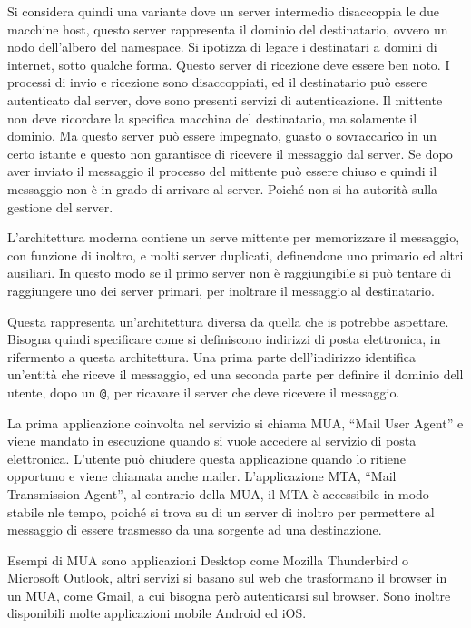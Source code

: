 \documentclass{article}
\numberwithin{equation}{subsection}
\begin{document}
Si considera quindi una variante dove un server intermedio disaccoppia le due macchine host, questo server rappresenta il dominio del destinatario, ovvero un nodo dell'albero del namespace. 
Si ipotizza di legare i destinatari a domini di internet, sotto qualche forma. Questo server di ricezione deve essere ben noto. 
I processi di invio e ricezione sono disaccoppiati, ed il destinatario può essere autenticato dal server, dove sono presenti servizi di autenticazione. Il mittente non deve ricordare la specifica macchina del destinatario, ma solamente il dominio. 
Ma questo server può essere impegnato, guasto o sovraccarico in un certo istante e questo non garantisce di ricevere il messaggio dal server. Se dopo aver inviato il messaggio il processo del mittente può essere chiuso e quindi il messaggio non è in grado di arrivare al server. Poiché non si ha autorità sulla gestione del server. 

L'architettura moderna contiene un serve mittente per memorizzare il messaggio, con funzione di inoltro, e molti server duplicati, definendone uno primario ed altri 
ausiliari. In questo modo se il primo server non è raggiungibile si può tentare di raggiungere uno dei server primari, per inoltrare il messaggio al destinatario. 

Questa rappresenta un'architettura diversa da quella che is potrebbe aspettare. Bisogna quindi specificare come si definiscono indirizzi di posta elettronica, in rifermento a questa architettura. Una prima parte dell'indirizzo identifica un'entità che riceve il messaggio, ed una seconda parte per definire il dominio dell utente, dopo un \verb|@|, per ricavare il server che deve ricevere il messaggio. 

La prima applicazione coinvolta nel servizio si chiama MUA, ``Mail User Agent'' e viene mandato in esecuzione quando si vuole accedere al servizio di posta elettronica. L'utente può chiudere questa applicazione quando lo ritiene opportuno e viene chiamata anche mailer. 
L'applicazione MTA, ``Mail Transmission Agent'', al contrario della MUA, il MTA è accessibile in modo stabile nle tempo, poiché si trova su di un server di inoltro per permettere al messaggio di essere trasmesso da una sorgente ad una destinazione. 

Esempi di MUA sono applicazioni Desktop come Mozilla Thunderbird o Microsoft Outlook, altri servizi si basano sul web che trasformano il browser in un MUA, come Gmail, a cui bisogna però autenticarsi sul browser. Sono inoltre disponibili molte applicazioni mobile Android ed iOS. 
\end{document}
